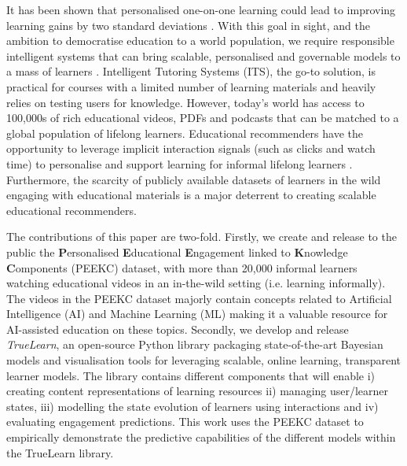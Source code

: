 \documentclass[letterpaper]{article} %
\begin{document}
It has been shown that personalised one-on-one learning could lead to improving learning gains by two standard deviations \cite{Bloom84}.
With this goal in sight, and the ambition to democratise education to a world population,
we require responsible intelligent systems that can bring scalable, personalised and governable models to a mass of learners \cite{democratise2021}.
Intelligent Tutoring Systems (ITS), the go-to solution, is practical for courses with a limited number of learning materials and heavily relies on testing users for knowledge. However, today's world has access to 100,000s of rich educational videos, PDFs and podcasts that can be matched to a global population of lifelong learners.
Educational recommenders have the opportunity to
leverage implicit interaction signals (such as clicks and watch time) to personalise and support learning for informal lifelong learners \cite{bulathwela2022sus}. Furthermore, {the scarcity of publicly available datasets of learners in the wild engaging with educational materials} is a major deterrent to creating scalable educational recommenders.

The contributions of this paper are two-fold. Firstly, we create and release to the public the \textbf{P}ersonalised \textbf{E}ducational \textbf{E}ngagement linked to \textbf{K}nowledge \textbf{C}omponents (PEEKC) dataset, with more than 20,000 informal learners watching educational videos in an in-the-wild setting (i.e. learning informally). The videos in the PEEKC dataset majorly contain concepts related to Artificial Intelligence (AI) and Machine Learning (ML) making it a valuable resource for AI-assisted education on these topics. Secondly, we develop and release \emph{TrueLearn},
an open-source Python library packaging state-of-the-art Bayesian models and visualisation tools for leveraging scalable, online learning, transparent learner models. The library contains different components that will enable i) creating content representations of learning resources ii) managing user/learner states, iii) modelling the state evolution of learners using interactions and iv) evaluating engagement predictions. This work uses the PEEKC dataset to empirically demonstrate the predictive capabilities of the different models within the TrueLearn library.
\end{document}
